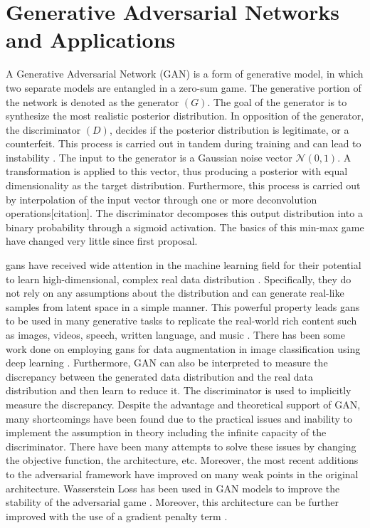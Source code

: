 \section{Generative Adversarial Networks and Applications}
\hspace{0.5in}A Generative Adversarial Network (GAN) is a form of generative model, in which two separate models are entangled in a zero-sum game. The generative portion of the network is denoted as the generator $(G)$. The goal of the generator is to synthesize the most realistic posterior distribution. In opposition of the generator, the discriminator $(D)$, decides if the posterior distribution is legitimate, or a counterfeit. This process is carried out in tandem during training and can lead to instability \cite{GAN}. The input to the generator is a Gaussian noise vector $\mathcal{N}(0, 1)$. A transformation is applied to this vector, thus producing a posterior with equal dimensionality as the target distribution. Furthermore, this process is carried out by interpolation of the input vector through one or more deconvolution operations[citation]. The discriminator decomposes this output distribution into a binary probability through a sigmoid activation. The basics of this min-max game have changed very little since first proposal. 

\hspace{0.5in}\acrlong{gans} have received wide attention in the machine learning field for their potential to learn high-dimensional, complex real data distribution \cite{GAN, overview}. Specifically, they do not rely on any assumptions about the distribution and can generate real-like samples from latent space in a simple manner. This powerful property leads \acrshort{gans} to be used in many generative tasks to replicate the real-world rich content such as images, videos, speech, written language, and music \cite{overview}. There has been some work done on employing \acrshort{gans} for data augmentation in image classification using deep learning \cite{overview}. Furthermore, GAN can also be interpreted to measure the discrepancy between the generated data distribution and the real data distribution and then learn to reduce it. The discriminator is used to implicitly measure the discrepancy. Despite the advantage and theoretical support of GAN, many shortcomings have been found due to the practical issues and inability to implement the assumption in theory including the infinite capacity of the discriminator. There have been many attempts to solve these issues by changing the objective function, the architecture, etc. Moreover, the most recent additions to the adversarial framework have improved on many weak points in the original architecture. Wasserstein Loss has been used in GAN models to improve the stability of the adversarial game \cite{WGAN}. Moreover, this architecture can be further improved with the use of a gradient penalty term \cite{WGAN-GP}.


